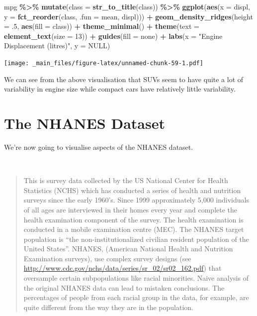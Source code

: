 \documentclass[
]{book}
\newenvironment{Shaded}{\begin{snugshade}}{\end{snugshade}}
\newcommand{\AttributeTok}[1]{\textcolor[rgb]{0.13,0.29,0.53}{#1}}
\newcommand{\ConstantTok}[1]{\textcolor[rgb]{0.56,0.35,0.01}{#1}}
\newcommand{\DecValTok}[1]{\textcolor[rgb]{0.00,0.00,0.81}{#1}}
\newcommand{\FunctionTok}[1]{\textcolor[rgb]{0.13,0.29,0.53}{\textbf{#1}}}
\newcommand{\NormalTok}[1]{#1}
\newcommand{\SpecialCharTok}[1]{\textcolor[rgb]{0.81,0.36,0.00}{\textbf{#1}}}
\newcommand{\StringTok}[1]{\textcolor[rgb]{0.31,0.60,0.02}{#1}}
\begin{document}
\begin{Shaded}
\begin{Highlighting}[]
\NormalTok{mpg }\SpecialCharTok{\%\textgreater{}\%}
  \FunctionTok{mutate}\NormalTok{(}\AttributeTok{class =} \FunctionTok{str\_to\_title}\NormalTok{(class)) }\SpecialCharTok{\%\textgreater{}\%}
  \FunctionTok{ggplot}\NormalTok{(}\FunctionTok{aes}\NormalTok{(}\AttributeTok{x =}\NormalTok{ displ, }\AttributeTok{y =} \FunctionTok{fct\_reorder}\NormalTok{(class, }\AttributeTok{.fun =}\NormalTok{ mean, displ))) }\SpecialCharTok{+}
  \FunctionTok{geom\_density\_ridges}\NormalTok{(}\AttributeTok{height =}\NormalTok{ .}\DecValTok{5}\NormalTok{, }\FunctionTok{aes}\NormalTok{(}\AttributeTok{fill =}\NormalTok{ class)) }\SpecialCharTok{+}
  \FunctionTok{theme\_minimal}\NormalTok{() }\SpecialCharTok{+}
  \FunctionTok{theme}\NormalTok{(}\AttributeTok{text =} \FunctionTok{element\_text}\NormalTok{(}\AttributeTok{size =} \DecValTok{13}\NormalTok{)) }\SpecialCharTok{+}
  \FunctionTok{guides}\NormalTok{(}\AttributeTok{fill =} \StringTok{\textquotesingle{}none\textquotesingle{}}\NormalTok{) }\SpecialCharTok{+} 
  \FunctionTok{labs}\NormalTok{(}\AttributeTok{x =} \StringTok{"Engine Displacement (litres)"}\NormalTok{,}
       \AttributeTok{y =} \ConstantTok{NULL}\NormalTok{)}
\end{Highlighting}
\end{Shaded}

\texttt{[image: \_main\_files/figure-latex/unnamed-chunk-59-1.pdf]}

We can see from the above visualisation that SUVs seem to have quite a lot of variability in engine size while compact cars have relatively little variability.

\hypertarget{the-nhanes-dataset}{%
\section{The NHANES Dataset}\label{the-nhanes-dataset}}

We're now going to visualise aspects of the NHANES dataset.

~~

\begin{quote}
This is survey data collected by the US National Center for Health Statistics (NCHS) which has conducted a series of health and nutrition surveys since the early 1960's. Since 1999 approximately 5,000 individuals of all ages are interviewed in their homes every year and complete the health examination component of the survey. The health examination is conducted in a mobile examination centre (MEC). The NHANES target population is ``the non-institutionalized civilian resident population of the United States''. NHANES, (American National Health and Nutrition Examination surveys), use complex survey designs (see \url{http://www.cdc.gov/nchs/data/series/sr_02/sr02_162.pdf}) that oversample certain subpopulations like racial minorities. Naive analysis of the original NHANES data can lead to mistaken conclusions. The percentages of people from each racial group in the data, for example, are quite different from the way they are in the population.
\end{quote}
\end{document}
